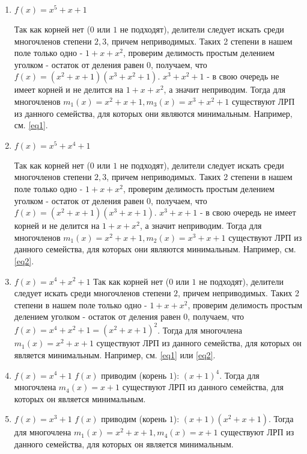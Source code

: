 \documentclass[utf8x, 14pt]{G7-32} %
\begin{document}
\begin{enumerate}
    \item $f(x) = x^5+x+1$
    
     Так как корней нет ($0$ или $1$ не подходят), делители следует искать среди многочленов степени $2,3$, причем неприводимых. Таких 2 степени в нашем поле только одно - $1 + x + x^2$, проверим делимость простым делением уголком - остаток от деления равен $0$, получаем, что $f(x) = (x^2+x+1)(x^3+x^2+1)$. $x^3+x^2+1$ - в свою очередь не имеет корней и не делится на $1 + x + x^2$, а значит неприводим. Тогда для многочленов $m_1(x)=x^2+x+1, m_3(x) = x^3+x^2+1$ существуют ЛРП из данного семейства, для которых они  являются минимальным. Например, см. \ref{eq1}.
     
     \item $f(x) = x^5+x^4+1$
     
     Так как корней нет ($0$ или $1$ не подходят), делители следует искать среди многочленов степени $2,3$, причем неприводимых. Таких 2 степени в нашем поле только одно - $1 + x + x^2$, проверим делимость простым делением уголком - остаток от деления равен $0$, получаем, что $f(x) = (x^2+x+1)(x^3+x+1)$. $x^3+x+1$ - в свою очередь не имеет корней и не делится на $1 + x + x^2$, а значит неприводим. Тогда для многочленов $m_1(x)=x^2+x+1, m_2(x)=x^3+x+1$ существуют ЛРП из данного семейства, для которых они  являются минимальным.  Например, см. \ref{eq2}.
     
     \item $f(x) = x^4+x^2+1$
     Так как корней нет ($0$ или $1$ не подходят), делители следует искать среди многочленов степени $2$, причем неприводимых. Таких 2 степени в нашем поле только одно - $1 + x + x^2$, проверим делимость простым делением уголком - остаток от деления равен $0$, получаем, что $f(x) = x^4+x^2+1 = (x^2+x+1)^2$. Тогда для многочлена $m_1(x)=x^2+x+1$ существуют ЛРП из данного семейства, для которых он  является минимальным.  Например, см. \ref{eq1} или \ref{eq2}.
     
     \item $f(x) = x^4+1$
     $f(x)$ приводим (корень $1$): $(x+1)^4$. Тогда для многочлена $m_4(x)=x+1$ существуют ЛРП из данного семейства, для которых он является минимальным. 
    
     \item $f(x) = x^3+1$
     $f(x)$ приводим (корень $1$): $(x+1)(x^2+x+1)$. Тогда для многочлена $m_1(x)=x^2+x+1, m_4(x)=x+1$ существуют ЛРП из данного семейства, для которых он  является минимальным. 
     
\end{enumerate}
\end{document}
